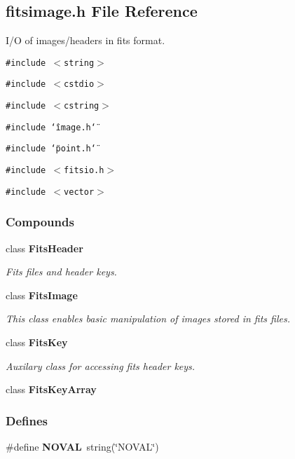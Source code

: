 \subsection{fitsimage.h File Reference}
\label{fitsimage_h}
I/O of images/headers in fits format. 


{\tt \#include $<$string$>$}\par
{\tt \#include $<$cstdio$>$}\par
{\tt \#include $<$cstring$>$}\par
{\tt \#include \char`\"{}image.h\char`\"{}}\par
{\tt \#include \char`\"{}point.h\char`\"{}}\par
{\tt \#include $<$fitsio.h$>$}\par
{\tt \#include $<$vector$>$}\par
\subsubsection*{Compounds}
\begin{CompactItemize}
\item 
class {\bf Fits\-Header}
\begin{CompactList}\small\item\em Fits files and header keys.\item\end{CompactList}\item 
class {\bf Fits\-Image}
\begin{CompactList}\small\item\em This class enables basic manipulation of images stored in fits files.\item\end{CompactList}\item 
class {\bf Fits\-Key}
\begin{CompactList}\small\item\em Auxilary class for accessing fits header keys.\item\end{CompactList}\item 
class {\bf Fits\-Key\-Array}
\end{CompactItemize}
\subsubsection*{Defines}
\begin{CompactItemize}
\item 
{}
\#define {\bf NOVAL}\ string(\char`\"{}NOVAL\char`\"{})\label{fitsimage_h_a0}

\end{CompactItemize}
